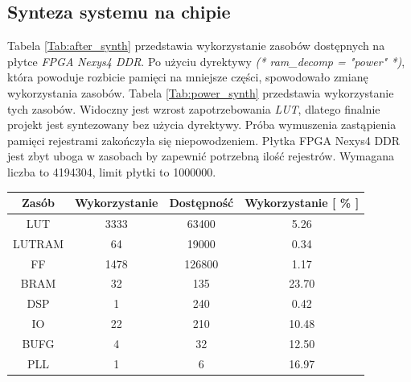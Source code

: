 \documentclass[11pt,a4paper]{article}
\begin{document}
\subsection{Synteza systemu na chipie}
\hspace{5mm}
 Tabela \ref{Tab:after_synth} przedstawia wykorzystanie zasobów dostępnych na płytce \textit{FPGA} \textit{Nexys4 DDR}. Po użyciu dyrektywy \textit{(* ram\_decomp = "power" *)}, która powoduje rozbicie pamięci na mniejsze części, spowodowało zmianę wykorzystania zasobów. Tabela \ref{Tab:power_synth} przedstawia wykorzystanie tych zasobów. Widoczny jest wzrost zapotrzebowania \textit{LUT}, dlatego finalnie projekt jest syntezowany bez użycia dyrektywy. Próba wymuszenia zastąpienia pamięci rejestrami zakończyła się niepowodzeniem. Płytka FPGA Nexys4 DDR jest zbyt uboga w zasobach by zapewnić potrzebną ilość rejestrów. Wymagana liczba to 4194304, limit płytki to 1000000.\\
\begin{minipage}[c]{\textwidth}
		 \begin{center}
				\begin{tabular}{|c|c|c|c|}
					\hline
					Zasób & Wykorzystanie & Dostępność & Wykorzystanie [ \% ] \\ 
					\hline
					LUT & 3333 & 63400 & 5.26  \\
					\hline
					LUTRAM & 64 & 19000 & 0.34  \\
					\hline
					FF & 1478 & 126800 & 1.17 \\
					\hline
					BRAM & 32 & 135 & 23.70 \\
					\hline
					DSP & 1 & 240 & 0.42 \\
					\hline
					IO & 22 & 210 & 10.48 \\
					\hline
					BUFG & 4 & 32 & 12.50 \\
					\hline
					PLL & 1 & 6 & 16.97 \\
					\hline															
				\end{tabular}
		\end{center}
\end{minipage}
\end{document}
